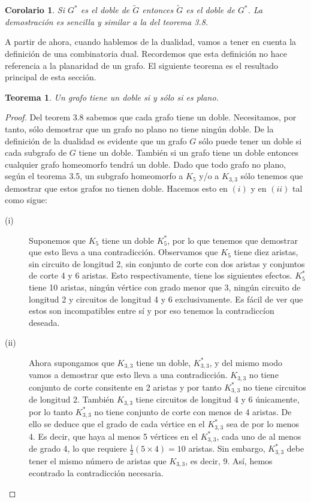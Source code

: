\documentclass[10pt,a5paper]{book}
\newtheorem{teorema}{Teorema}[chapter]
\newtheorem{cor}[]{Corolario}[chapter]
\begin{document}
\begin{cor}
Si $G^*$ es el doble de $\widetilde{G}$ entonces $\widetilde{G}$ es el doble de $G^*$. La demostración es sencilla y similar a la del teorema 3.8.
\end{cor}

A partir de ahora, cuando hablemos de la dualidad, vamos a tener en cuenta la definición de una combinatoria dual. Recordemos que esta definición no hace referencia a la planaridad de un grafo. El siguiente teorema es el resultado principal de esta sección.

\begin{teorema}
Un grafo tiene un doble si y sólo si es plano.
\end{teorema}
\begin{proof}
Del teorem 3.8 sabemos que cada grafo tiene un doble. Necesitamos, por tanto, sólo demostrar que un grafo no plano no tiene ningún doble. De la definición de la dualidad es evidente que un grafo $G$ sólo puede tener un doble si cada subgrafo de $G$ tiene un doble. También si un grafo tiene un doble entonces cualquier grafo homeomorfo tendrá un doble. Dado que todo grafo no plano, según el teorema 3.5, un subgrafo homeomorfo a $K_5$ y/o a $K_{3,3}$ sólo tenemos que demostrar que estos grafos no tienen doble. Hacemos esto en $(i)$ y en $(ii)$ tal como sigue:
\begin{description}
\item[(i)] Suponemos que $K_5$ tiene un doble $K_5^*$, por lo que tenemos que demostrar que esto lleva a una contradicción. Observamos que $K_5$ tiene diez aristas, sin circuito de longitud 2, sin conjunto de corte con dos aristas y conjuntos de corte 4 y 6 aristas. Esto respectivamente, tiene los siguientes efectos. $K_5^*$ tiene 10 aristas, ningún vértice con grado menor que 3, ningún circuito de longitud 2 y circuitos de longitud 4 y 6 exclusivamente. Es fácil de ver que estos son incompatibles entre sí y por eso tenemos la contradiccíon deseada.
\item[(ii)] Ahora supongamos que $K_{3,3}$ tiene un doble, $K_{3,3}^*$, y del mismo modo vamos a demostrar que esto lleva a una contradicción. $K_{3,3}$ no tiene conjunto de corte consitente en 2 aristas y por tanto $K_{3,3}^*$ no tiene circuitos de longitud 2. También $K_{3,3}$ tiene circuitos de longitud 4 y 6 únicamente, por lo tanto $K_{3,3}^*$ no tiene conjunto de corte con menos de 4 aristas. De ello se deduce que el grado de cada vértice en el $K_{3,3}^*$ sea de por lo menos 4. Es decir, que haya al menos 5 vértices en el $K_{3,3}^*$, cada uno de al menos de grado 4, lo que requiere $\frac{1}{2}(5 \times 4) = 10$ aristas. Sin embargo, $K_{3,3}^*$ debe tener el mismo número de aristas que $K_{3,3}$, es decir, 9. Así, hemos econtrado la contradicción necesaria.
\end{description}
\end{proof} 
\end{document}
